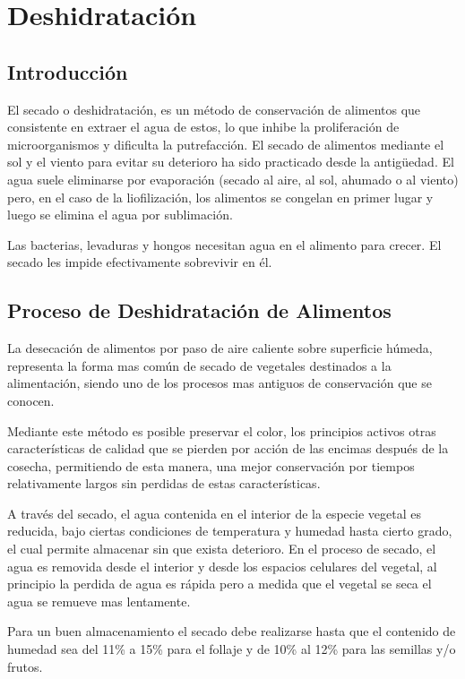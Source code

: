\chapter{Deshidratación}
\section{Introducción}

El secado o deshidratación, es un método de conservación de alimentos que
consistente en extraer el agua de estos, lo que inhibe la proliferación de
microorganismos y dificulta la putrefacción. El secado de alimentos mediante el
sol y el viento para evitar su deterioro ha sido practicado desde la
antigüedad. El agua suele eliminarse por evaporación (secado al aire, al sol,
ahumado o al viento) pero, en el caso de la liofilización, los alimentos se
congelan en primer lugar y luego se elimina el agua por sublimación.

Las bacterias, levaduras y hongos necesitan agua en el alimento para crecer. El
secado les impide efectivamente sobrevivir en él.


\section{Proceso de Deshidratación de Alimentos}

La desecación de alimentos por paso de aire caliente sobre superficie húmeda,
representa la forma mas común de secado de vegetales destinados a la
alimentación, siendo uno de los procesos mas antiguos de conservación que se
conocen.

Mediante este método es posible preservar el color, los principios activos otras
características de calidad que se pierden por acción de las encimas después de
la cosecha, permitiendo de esta manera, una mejor conservación por tiempos
relativamente largos sin perdidas de estas características.

A través del secado, el agua contenida en el interior de la especie vegetal es
reducida, bajo ciertas condiciones de temperatura y humedad hasta cierto grado,
el cual permite almacenar sin que exista deterioro. En el proceso de secado, el
agua es removida desde el interior y desde los espacios celulares del vegetal,
al principio la perdida de agua es rápida pero a medida que el vegetal se seca
el agua se remueve mas lentamente.

Para un buen almacenamiento el secado debe realizarse hasta que el contenido de
humedad sea del 11\% a 15\% para el follaje y de 10\% al 12\% para las semillas
y/o frutos.

